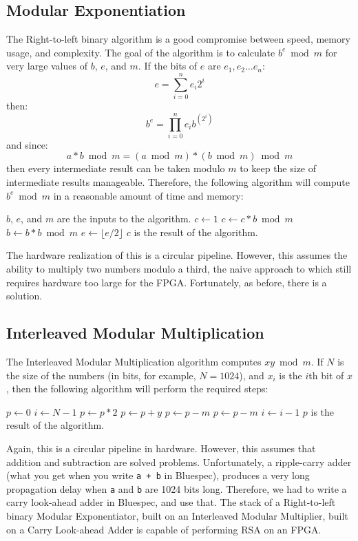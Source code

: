 \documentclass[a4paper,11pt]{report}
\begin{document}
\subsection{Modular Exponentiation}
The Right-to-left binary algorithm is a good compromise between speed, memory usage, and complexity.
The goal of the algorithm is to calculate $b^e \bmod m$ for very large values of $b$, $e$, and $m$.
If the bits of $e$ are $e_1, e_2 \dots e_n$:
\begin{equation}
e = \sum_{i = 0}^{n} e_i 2^i
\end{equation}
then:
\begin{equation}
b^e = \prod_{i = 0}^{n} e_i b^{(2^i)}
\end{equation}
and since:
\begin{equation}
a * b \bmod m = (a \bmod m) * (b \bmod m) \bmod m
\end{equation}
then every intermediate result can be taken modulo $m$ to keep the size of intermediate results manageable.
Therefore, the following algorithm will compute $b^e \bmod m$ in a reasonable amount of time and memory:
\begin{algorithmic}
\State $b$, $e$, and $m$ are the inputs to the algorithm.
\State $c \gets 1$
		\State $c \gets c * b \bmod m$
	\EndIf
	\State $b \gets b * b \bmod m$
	\State $e \gets \lfloor e / 2 \rfloor$
\EndWhile
\State $c$ is the result of the algorithm.
\end{algorithmic}
The hardware realization of this is a circular pipeline.
However, this assumes the ability to multiply two numbers modulo a third,
the naive approach to which still requires hardware too large for the FPGA.
Fortunately, as before, there is a solution.
\subsection{Interleaved Modular Multiplication}
The Interleaved Modular Multiplication algorithm computes $xy \bmod m$.
If $N$ is the size of the numbers (in bits, for example, $N = 1024$),
and $x_i$ is the $i$th bit of $x$, then the following algorithm will perform the required steps:
\begin{algorithmic}
\State $p \gets 0$
\State $i \gets N - 1$
	\State $p \gets p * 2$
		\State $p \gets p + y$
	\EndIf
		\State $p \gets p - m$
	\EndIf
		\State $p \gets p - m$
	\EndIf
  \State $i \gets i - 1$
\EndWhile
\State $p$ is the result of the algorithm.
\end{algorithmic}
Again, this is a circular pipeline in hardware.
However, this assumes that addition and subtraction are solved problems.
Unfortunately, a ripple-carry adder (what you get when you write {\tt a + b} in Bluespec),
produces a very long propagation delay when {\tt a} and {\tt b} are 1024 bits long.
Therefore, we had to write a carry look-ahead adder in Bluespec, and use that.
The stack of a Right-to-left binary Modular Exponentiator,
built on an Interleaved Modular Multiplier,
built on a Carry Look-ahead Adder
is capable of performing RSA on an FPGA.
\end{document}
